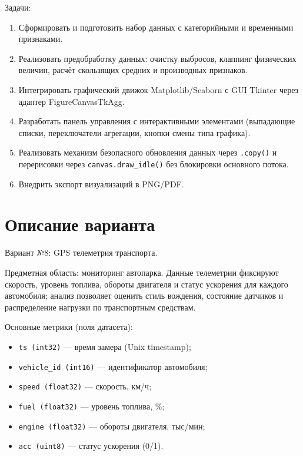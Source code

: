 \documentclass[oneside,a4paper,14pt]{extarticle}
\begin{document}
Задачи:
\begin{enumerate}[leftmargin=*]
	\item Сформировать и подготовить набор данных с категорийными и временными признаками.
	\item Реализовать предобработку данных: очистку выбросов, клаппинг физических величин, расчёт скользящих средних и производных признаков.
	\item Интегрировать графический движок Matplotlib/Seaborn с GUI Tkinter через адаптер FigureCanvasTkAgg.
	\item Разработать панель управления с интерактивными элементами (выпадающие списки, переключатели агрегации, кнопки смены типа графика).
	\item Реализовать механизм безопасного обновления данных через \texttt{.copy()} и перерисовки через \texttt{canvas.draw\_idle()} без блокировки основного потока.
	\item Внедрить экспорт визуализаций в PNG/PDF.
\end{enumerate}

\section{Описание варианта}

Вариант №8: GPS телеметрия транспорта.

Предметная область: мониторинг автопарка. Данные телеметрии фиксируют скорость, уровень топлива, обороты двигателя и статус ускорения для каждого автомобиля; анализ позволяет оценить стиль вождения, состояние датчиков и распределение нагрузки по транспортным средствам.

Основные метрики (поля датасета):
\begin{itemize}[leftmargin=*]
	\item \texttt{ts (int32)} --- время замера (Unix timestamp);
	\item \texttt{vehicle\_id (int16)} --- идентификатор автомобиля;
	\item \texttt{speed (float32)} --- скорость, км/ч;
	\item \texttt{fuel (float32)} --- уровень топлива, \%;
	\item \texttt{engine (float32)} --- обороты двигателя, тыс/мин;
	\item \texttt{acc (uint8)} --- статус ускорения (0/1).
\end{itemize}
\end{document}
